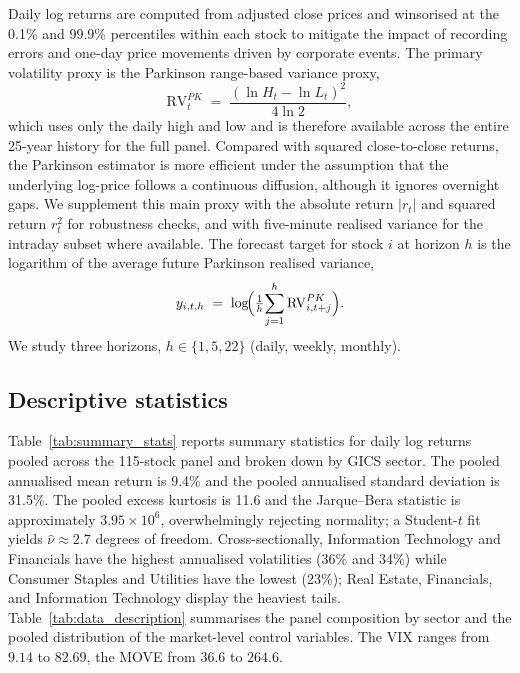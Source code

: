 \documentclass[11pt,a4paper]{article}
\newcommand{\RVPK}{\mathrm{RV}^{PK}}
\begin{document}
Daily log returns are computed from adjusted close prices and winsorised
at the 0.1\% and 99.9\% percentiles within each stock to mitigate the
impact of recording errors and one-day price movements driven by
corporate events. The primary volatility proxy is the Parkinson
range-based variance proxy,
\begin{equation}
  \RVPK_t \;=\; \frac{(\ln H_t - \ln L_t)^2}{4\ln 2},
  \label{eq:parkinson}
\end{equation}
which uses only the daily high and low and is therefore available across
the entire 25-year history for the full panel. Compared with squared
close-to-close returns, the Parkinson estimator is more efficient under
the assumption that the underlying log-price follows a continuous
diffusion, although it ignores overnight gaps. We supplement this main
proxy with the absolute return $|r_t|$ and squared return $r_t^2$ for
robustness checks, and with five-minute realised variance for the
intraday subset where available. The forecast target for stock $i$ at
horizon $h$ is the logarithm of the average future Parkinson realised
variance,
\begin{equation}
  y_{i,t,h} \;=\; \log\!\Bigl(\tfrac{1}{h}\!\sum_{j=1}^{h}
  \RVPK_{i,t+j}\Bigr).
\end{equation}
We study three horizons, $h\in\{1,5,22\}$ (daily, weekly, monthly).

\subsection{Descriptive statistics}

Table~\ref{tab:summary_stats} reports summary statistics for daily log
returns pooled across the 115-stock panel and broken down by GICS
sector. The pooled annualised mean return is 9.4\% and the pooled
annualised standard deviation is 31.5\%. The pooled excess kurtosis is
11.6 and the Jarque--Bera statistic is approximately $3.95\!\times\!10^6$,
overwhelmingly rejecting normality; a Student-$t$ fit yields
$\hat\nu\approx 2.7$ degrees of freedom. Cross-sectionally, Information
Technology and Financials have the highest annualised volatilities
(36\% and 34\%) while Consumer Staples and Utilities have the lowest
(23\%); Real Estate, Financials, and Information Technology display the
heaviest tails. Table~\ref{tab:data_description} summarises the panel
composition by sector and the pooled distribution of the market-level
control variables. The VIX ranges from $9.14$ to $82.69$, the MOVE from
$36.6$ to $264.6$.
\end{document}
